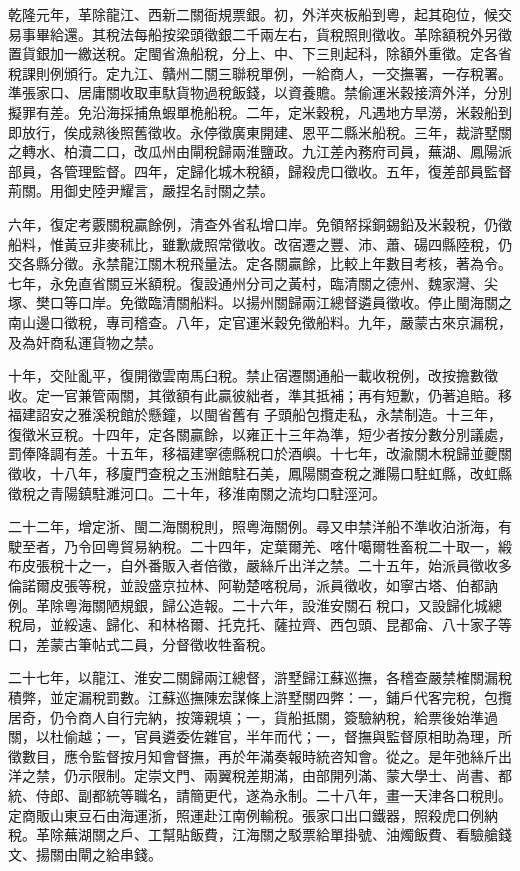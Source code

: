 \begin{pinyinscope}
乾隆元年，革除龍江、西新二關衙規票銀。初，外洋夾板船到粵，起其砲位，候交易事畢給還。其稅法每船按梁頭徵銀二千兩左右，貨稅照則徵收。革除額稅外另徵置貨銀加一繳送稅。定閩省漁船稅，分上、中、下三則起科，除額外重徵。定各省稅課則例頒行。定九江、贛州二關三聯稅單例，一給商人，一交撫署，一存稅署。準張家口、居庸關收取車馱貨物過稅飯錢，以資養贍。禁偷運米穀接濟外洋，分別擬罪有差。免沿海採捕魚蝦單桅船稅。二年，定米穀稅，凡遇地方旱澇，米穀船到即放行，俟成熟後照舊徵收。永停徵廣東開建、恩平二縣米船稅。三年，裁滸墅關之轉水、柏瀆二口，改瓜州由閘稅歸兩淮鹽政。九江差內務府司員，蕪湖、鳳陽派部員，各管理監督。四年，定歸化城木稅額，歸殺虎口徵收。五年，復差部員監督荊關。用御史陸尹耀言，嚴捏名討關之禁。

六年，復定考覈關稅贏餘例，清查外省私增口岸。免領帑採銅錫鉛及米穀稅，仍徵船料，惟黃豆非麥秫比，雖歉歲照常徵收。改宿遷之豐、沛、蕭、碭四縣陸稅，仍交各縣分徵。永禁龍江關木稅飛量法。定各關贏餘，比較上年數目考核，著為令。七年，永免直省關豆米額稅。復設通州分司之黃村，臨清關之德州、魏家灣、尖塚、樊口等口岸。免徵臨清關船料。以揚州關歸兩江總督遴員徵收。停止閩海關之南山邊口徵稅，專司稽查。八年，定官運米穀免徵船料。九年，嚴蒙古來京漏稅，及為奸商私運貨物之禁。

十年，交阯亂平，復開徵雲南馬臼稅。禁止宿遷關通船一載收稅例，改按擔數徵收。定一官兼管兩關，其徵額有此贏彼絀者，準其抵補；再有短歉，仍著追賠。移福建詔安之雅溪稅館於懸鐘，以閩省舊有子頭船包攬走私，永禁制造。十三年，復徵米豆稅。十四年，定各關贏餘，以雍正十三年為準，短少者按分數分別議處，罰俸降調有差。十五年，移福建寧德縣稅口於酒嶼。十七年，改渝關木稅歸並夔關徵收，十八年，移廈門查稅之玉洲館駐石美，鳳陽關查稅之濉陽口駐虹縣，改虹縣徵稅之青陽鎮駐濉河口。二十年，移淮南關之流均口駐涇河。

二十二年，增定浙、閩二海關稅則，照粵海關例。尋又申禁洋船不準收泊浙海，有駛至者，乃令回粵貿易納稅。二十四年，定葉爾羌、喀什噶爾牲畜稅二十取一，緞布皮張稅十之一，自外番販入者倍徵，嚴絲斤出洋之禁。二十五年，始派員徵收多倫諾爾皮張等稅，並設盛京拉林、阿勒楚喀稅局，派員徵收，如寧古塔、伯都訥例。革除粵海關陋規銀，歸公造報。二十六年，設淮安關石稅口，又設歸化城總稅局，並綏遠、歸化、和林格爾、托克托、薩拉齊、西包頭、昆都侖、八十家子等口，差蒙古筆帖式二員，分督徵收牲畜稅。

二十七年，以龍江、淮安二關歸兩江總督，滸墅歸江蘇巡撫，各稽查嚴禁榷關漏稅積弊，並定漏稅罰數。江蘇巡撫陳宏謀條上滸墅關四弊：一，鋪戶代客完稅，包攬居奇，仍令商人自行完納，按簿親填；一，貨船抵關，簽驗納稅，給票後始準過關，以杜偷越；一，官員遴委佐雜官，半年而代；一，督撫與監督原相助為理，所徵數目，應令監督按月知會督撫，再於年滿奏報時統咨知會。從之。是年弛絲斤出洋之禁，仍示限制。定崇文門、兩翼稅差期滿，由部開列滿、蒙大學士、尚書、都統、侍郎、副都統等職名，請簡更代，遂為永制。二十八年，畫一天津各口稅則。定商販山東豆石由海運浙，照運赴江南例輸稅。張家口出口鐵器，照殺虎口例納稅。革除蕪湖關之戶、工幫貼飯費，江海關之駁票給單掛號、油燭飯費、看驗艙錢文、揚關由閘之給串錢。


\end{pinyinscope}
